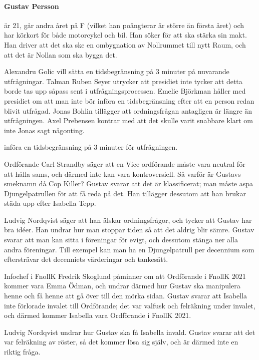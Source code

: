 \documentclass[hidelinks]{sektionsmote} %
\begin{document}
\paragraph{Gustav Persson} är 21, går andra året på F (vilket han poängterar är större än första året) och har körkort för både motorcykel och bil.
Han söker för att ska stärka sin makt.
Han driver att det ska ske en ombygnation av Nollrummet till nytt Raum, och att det är Nollan som ska bygga det.
\begin{ofraga}
  Alexandru Golic vill sätta en tidsbegränsning på 3 minuter på nuvarande utfrågningar.
  Talman Ruben Seyer utrycker att presidiet inte tycker att detta borde tas upp såpass sent i utfrågningsprocessen.
  Emelie Björkman håller med presidiet om att man inte bör införa en tidsbegränsning efter att en person redan blivit utfrågad.
  Jonas Bohlin tillägger att ordningsfrågan antagligen är längre än utfrågningen.
  Axel Prebensen kontrar med att det skulle varit snabbare klart om inte Jonas sagt någonting.
  \begin{beslut}
    \item införa en tidsbegränsning på 3 minuter för utfrågningen.
  \end{beslut}
\end{ofraga}
Ordförande Carl Strandby säger att en Vice ordförande måste vara neutral för att hålla sams, och därmed inte kan vara kontroversiell.
Så varför är Gustavs smeknamn då Cop Killer?
Gustav svarar att det är klassificerat; man måste aspa Djungelpatrullen för att få reda på det.
Han tillägger dessutom att han brukar städa upp efter Isabella Tepp.\par
Ludvig Nordqvist säger att han älskar ordningsfrågor, och tycker att Gustav har bra idéer.
Han undrar hur man stoppar tiden så att det aldrig blir sämre.
Gustav svarar att man kan sitta i föreningar för evigt, och dessutom stänga ner alla andra föreningar.
Till exempel kan man ha en Djungelpatrull per decennium som eftersträvar det decenniets värderingar och tankesätt.\par
Infochef i FnollK Fredrik Skoglund påminner om att Ordförande i FnollK 2021 kommer vara Emma Ödman, och undrar därmed hur Gustav ska manipulera henne och få henne att gå över till den mörka sidan.
Gustav svarar att Isabella inte förlorade invalet till Ordförande; det var valfusk och felräkning under invalet, och därmed kommer Isabella vara Ordförande i FnollK 2021.\par
Ludvig Nordqvist undrar hur Gustav ska få Isabella invald.
Gustav svarar att det var felräkning av röster, så det kommer lösa sig själv, och är därmed inte en riktig fråga.
\end{document}
